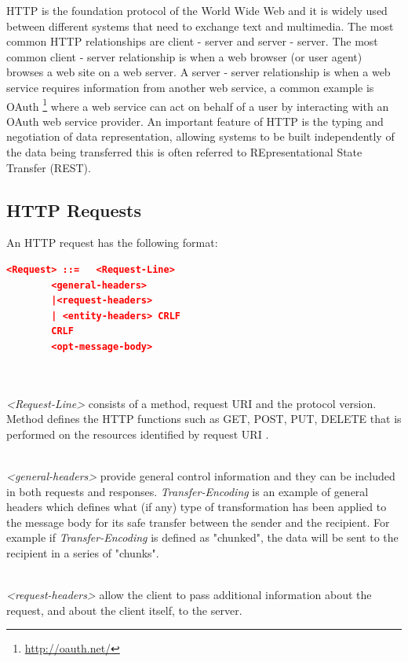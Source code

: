 \documentclass[a4paper,11pt,twoside]{article}
\begin{document}
HTTP is the foundation protocol of the World Wide Web and it is widely used between different systems that need to exchange text and multimedia.  The most common HTTP relationships are client - server and server - server.  The most common client - server relationship is when a web browser (or user agent) browses a web site on a web server.  A server - server relationship is when a web service requires information from another web service, a common example is OAuth \footnote{\label{OAuth} \url{http://oauth.net/}} where a web service can act on behalf of a user by interacting with an OAuth web service provider.  An important feature of HTTP is the typing and negotiation of data representation, allowing systems to be built independently of the data being transferred this is often referred to REpresentational State Transfer (REST).

\subsection{HTTP Requests} \label{Requests}
An HTTP request has the following format:\\

\begin{lstlisting}[language=json]
<Request> ::=	<Request-Line>
		<general-headers>
		|<request-headers>
		| <entity-headers> CRLF
		CRLF 
		<opt-message-body>
		
\end{lstlisting} 
\noindent\\
\textit{<Request-Line>} consists of a method, request URI and the protocol version. Method defines the HTTP functions such as GET, POST, PUT, DELETE that is performed on the resources identified by request URI . 

\noindent\\
\textit{<general-headers>} provide general control information and they can be included in both requests and responses. \textit{Transfer-Encoding} is an example of general headers which defines what (if any) type of transformation has been applied to the message body for its safe transfer between the sender and the recipient. For example if \textit{Transfer-Encoding} is defined as "chunked", the data will be sent to the recipient in a series of "chunks". 

\noindent\\
\textit{<request-headers>} allow the client to pass additional information about the request, and about the client itself, to the server. 
\end{document}
